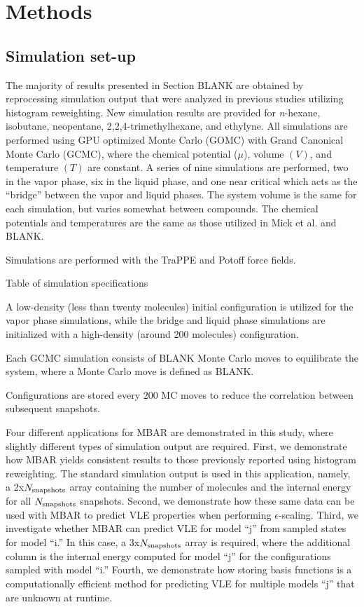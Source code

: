 \documentclass[11pt,a4paper]{article}
\begin{document}
\section{Methods}

\subsection{Simulation set-up}

The majority of results presented in Section BLANK are obtained by reprocessing simulation output that were analyzed in previous studies utilizing histogram reweighting. New simulation results are provided for \textit{n}-hexane, isobutane, neopentane, 2,2,4-trimethylhexane, and ethylyne. All simulations are performed using GPU optimized Monte Carlo (GOMC) with Grand Canonical Monte Carlo (GCMC), where the chemical potential ($\mu$), volume $(V)$, and temperature $(T)$ are constant. A series of nine simulations are performed, two in the vapor phase, six in the liquid phase, and one near critical which acts as the ``bridge'' between the vapor and liquid phases. The system volume is the same for each simulation, but varies somewhat between compounds. The chemical potentials and temperatures are the same as those utilized in Mick et al. and BLANK.

Simulations are performed with the TraPPE and Potoff force fields.

Table of simulation specifications 

A low-density (less than twenty molecules) initial configuration is utilized for the vapor phase simulations, while the bridge and liquid phase simulations are initialized with a high-density (around 200 molecules) configuration.

Each GCMC simulation consists of BLANK Monte Carlo moves to equilibrate the system, where a Monte Carlo move is defined as BLANK. 

Configurations are stored every 200 MC moves to reduce the correlation between subsequent snapshots.

Four different applications for MBAR are demonstrated in this study, where slightly different types of simulation output are required. First, we demonstrate how MBAR yields consistent results to those previously reported using histogram reweighting. The standard simulation output is used in this application, namely, a 2x$N_{\rm snapshots}$ array containing the number of molecules and the internal energy for all $N_{\rm snapshots}$ snapshots. Second, we demonstrate how these same data can be used with MBAR to predict VLE properties when performing $\epsilon$-scaling. Third, we investigate whether MBAR can predict VLE for model ``j'' from sampled states for model ``i.'' In this case, a 3x$N_{\rm snapshots}$ array is required, where the additional column is the internal energy computed for model ``j'' for the configurations sampled with model ``i.'' Fourth, we demonstrate how storing basis functions is a computationally efficient method for predicting VLE for multiple models ``j'' that are unknown at runtime.   
\end{document}
